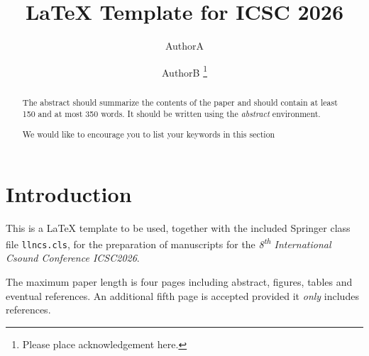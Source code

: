 \documentclass[runningheads,a4paper]{llncs}
\newcommand{\keywords}[1]{\par\addvspace\baselineskip
\noindent\keywordname\enspace\ignorespaces#1}
\begin{document}
\mainmatter  %

\title{\LaTeX{} Template for ICSC 2026}




\author{AuthorA\and AuthorB \thanks{Please place acknowledgement here.}}
%


%
%


\maketitle


\begin{abstract}
The abstract should summarize the contents of the paper and should
contain at least 150 and at most 350 words. It should be written using the
\emph{abstract} environment.
\keywords{We would like to encourage you to list your keywords in this
section}
\end{abstract}


\section{Introduction}

This is a \LaTeX{} template to be used, together with the included Springer
class file \texttt{llncs.cls}, for the preparation of manuscripts for the
\textit{8\textsuperscript{th} International Csound Conference
\textemdash{} ICSC2026}.

The maximum paper length is four pages including abstract, figures, tables
and eventual references. An additional fifth page is accepted provided it
\textit{only} includes references.
\end{document}
